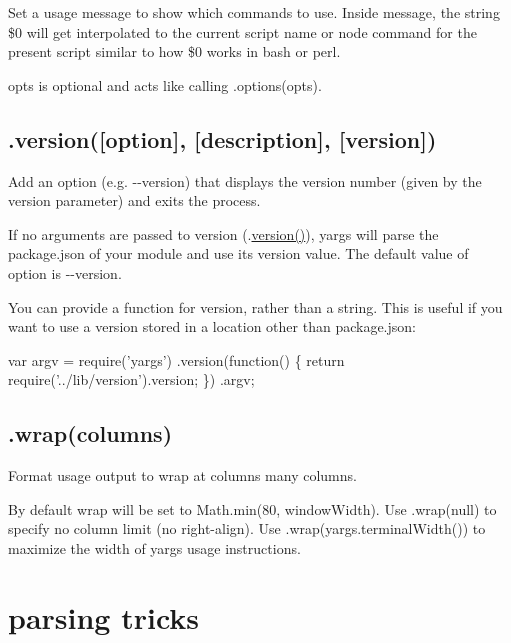 Set a usage message to show which commands to use. Inside {\ttfamily message}, the string {\ttfamily \$0} will get interpolated to the current script name or node command for the present script similar to how {\ttfamily \$0} works in bash or perl.

{\ttfamily opts} is optional and acts like calling {\ttfamily .options(opts)}.

\subsection*{\label{_version}%
.version(\mbox{[}option\mbox{]}, \mbox{[}description\mbox{]}, \mbox{[}version\mbox{]}) }

Add an option (e.\+g. {\ttfamily -\/-\/version}) that displays the version number (given by the {\ttfamily version} parameter) and exits the process.

If no arguments are passed to {\ttfamily version} ({\ttfamily .\mbox{\hyperlink{namespacesetup_a2aa722b36a933088812b50ea79b97a5c}{version()}}}), yargs will parse the {\ttfamily package.\+json} of your module and use its {\ttfamily version} value. The default value of {\ttfamily option} is {\ttfamily -\/-\/version}.

You can provide a {\ttfamily function} for version, rather than a string. This is useful if you want to use a version stored in a location other than package.\+json\+:


\begin{DoxyCode}
var argv = require('yargs')
  .version(function() \{
    return require('../lib/version').version;
  \})
  .argv;
\end{DoxyCode}


\subsection*{\label{_wrap}%
.wrap(columns) }

Format usage output to wrap at {\ttfamily columns} many columns.

By default wrap will be set to {\ttfamily Math.\+min(80, window\+Width)}. Use {\ttfamily .wrap(null)} to specify no column limit (no right-\/align). Use {\ttfamily .wrap(yargs.\+terminal\+Width())} to maximize the width of yargs\textquotesingle{} usage instructions.

\section*{parsing tricks }

